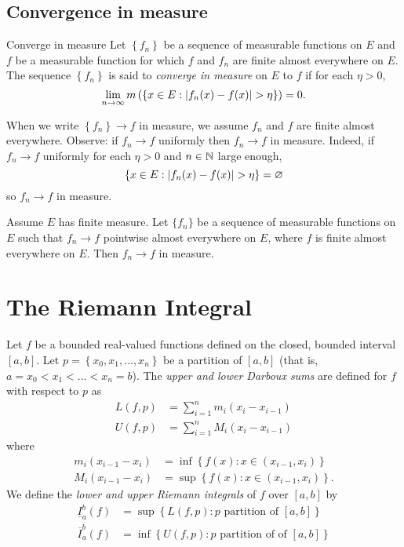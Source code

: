 \subsection{Convergence in measure}

\begin{definition}{Converge in measure}
	Let $\left\{ f_n \right\}$ be a sequence of measurable functions
	on $E$ and $f$ be a measurable function for which $f$ and $f_n$
	are finite almost everywhere on $E$.
	The sequence $\left\{ f_n \right\}$ is said to \emph{converge
	in measure} on $E$ to $f$ if for each $\eta > 0$,
	\[
		\lim_{n \to \infty} m\left( 
			\left\{ x \in E: \left\lvert f_n(x) - f(x) \right\rvert > \eta \right\} 
		 \right) = 0.
	\]
\end{definition}

When we write $\left\{ f_n \right\} \to f$ in measure, we assume
$f_n$ and $f$ are finite almost everywhere. Observe:
if $f_n \to f$ uniformly then $f_n \to f$ in measure.
Indeed, if $f_n \to f$ uniformly for each $\eta > 0$ and $n \in \mathbb{N}$
large enough,
\[
	\left\{ x \in E: \left\lvert f_n(x) - f(x) \right\rvert > \eta \right\} = \varnothing
\]
so $f_n \to f$ in measure.

\begin{proposition}
	Assume $E$ has finite measure.
	Let $\{f_n\}$ be a sequence of measurable functions on $E$ such that
	$f_n \to f$ pointwise almost everywhere on $E$,
	where $f$ is finite almost everywhere on $E$.
	Then $f_n \to f$ in measure.
\end{proposition}

\section{The Riemann Integral}

Let $f$ be a bounded real-valued functions defined on the closed, bounded
interval $[a,b]$.
Let $p = \left\{ x_0, x_1, \ldots, x_n \right\}$ be a partition of $[a,b]$
(that is, $a = x_0 < x_1 < \ldots < x_n = b$).
The \emph{upper and lower Darboux sums} are defined for $f$ with respect to
$p$ as
\begin{align*}
	L(f,p) &= \sum_{i=1}^n m_i\left( x_i - x_{i-1} \right) \\
	U(f,p) &= \sum_{i=1}^n M_i\left( x_i - x_{i-1} \right)
\end{align*}
where
\begin{align*}
	m_i(x_{i-1} - x_i) &= \inf\left\{ f(x): x \in (x_{i-1}, x_i) \right\} \\
	M_i(x_{i-1} - x_i) &= \sup\left\{ f(x): x \in (x_{i-1}, x_i) \right\}.
\end{align*}
We define the \emph{lower and upper Riemann integrals} of $f$ over $[a,b]$
by 
\begin{align*}
	\underline{I}_a^b(f) &= \sup\left\{ L(f, p): 
		\text{$p$ partition of $[a,b]$} \right\} \\
	\overline{I}_a^b(f) &= \inf\left\{ U(f,p): 
		\text{$p$ partition of of $[a,b]$} \right\}
\end{align*}


